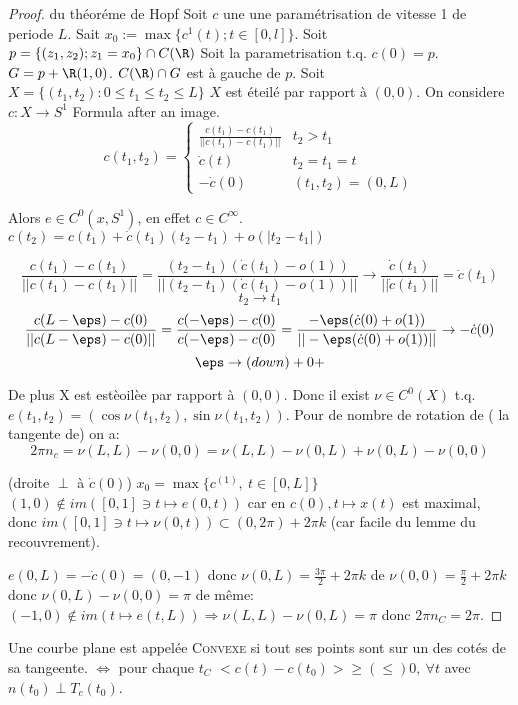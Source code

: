 \begin{proof}{du théoréme de Hopf}
	Soit $c$ une une paramétrisation de vitesse 1 de periode $L$. Sait $x_0:=\max\{c^1(t); t\in [0, l]\}$. Soit $p=\{(z_1, z_2); z_1=x_0\}\cap C(\R)$
	Soit la parametrisation t.q. $c(0)=p$. $G=p+\R(1,0)$. $C(\R)\cap G$ est à gauche de $p$.
	Soit $X=\{(t_1, t_2): 0\leq t_1\leq t_2 \leq L\}$ %
	$X$ est éteilé par rapport à $(0,0)$. On considere $c:X\rightarrow S^1$
	Formula after an image.
	$$c(t_1,t_2)=\left\{ \begin{array}{cr}\frac{c(t_1)-c(t_1)}{||c(t_1)-c(t_1)||} & t_2>t_1 \\ \dot c(t) & t_2=t_1=t \\ -\dot c(0) & (t_1, t_2)=(0,L)\end{array}\right.$$
	
	Alors $e\in C^0(x, S^1)$, en effet $c\in C^\infty.$ $c(t_2)=c(t_1)+\dot c(t_1)(t_2-t_1)+o(|t_2-t_1|)$
	
	$$\frac{c(t_1)-c(t_1)}{||c(t_1)-c(t_1)||}=\frac{(t_2-t_1)(\dot c(t_1)-o(1))}{||(t_2-t_1)(\dot c(t_1)-o(1))||}\to \frac{\dot c(t_1)}{||\dot c(t_1)||}=\dot c(t_1)$$
	$$t_2\to t_1$$
	$$\frac{c(L-\eps)-c(0)}{||c(L-\eps)-c(0)||}=\frac{c(-\eps)-c(0)}{c(-\eps)-c(0)}=\frac{-\eps(\dot c(0)+o(1))}{||-\eps(\dot c(0)+o(1))||}\to -\dot c(0)$$
	$$\eps\to(down) +0+$$
	
	De plus X est estèoilèe par rapport à $(0,0)$. Donc il exist $\nu\in C^0(X)$ t.q. $e(t_1, t_2)=(\cos \nu(t_1,t_2), \sin \nu(t_1,t_2))$. Pour de nombre de rotation de ( la tangente de) on a:
	$$2\pi n_c=\nu(L,L)-\nu(0,0)=\nu(L,L) - \nu(0,L)+\nu(0,L)-\nu(0,0)$$
	
	
	(droite $\perp$ à $\dot c(0)$) $x_0=\max \{ c^{(1)},\ t\in [0, L]\}$ $(1,0)\not\in im([0,1]\ni t\mapsto e(0,t))$ car en $c(0), t\mapsto x(t)$ est maximal, donc $im([0,1]\ni t\mapsto \nu(0,t))\subset (0,2\pi)+2\pi k$ (car facile du lemme du recouvrement).
	
	$e(0,L)=-\dot c(0)=(0,-1)$ donc $\nu (0,L)=\frac{3\pi}{2}+2\pi k$ de $\nu(0,0)=\frac{\pi}2+2\pi k $ donc $\nu(0,L)-\nu(0,0)=\pi$ de même: $(-1, 0)\not\in im(t\mapsto e(t, L))\Rightarrow \nu(L,L) - \nu(0, L)=\pi$ donc $2\pi n_C=2\pi$.
\end{proof}

\begin{definition}
	 Une courbe plane est appelée \textsc{Convexe} si tout ses points sont sur un des cotés de sa tangeente. $\Leftrightarrow$ pour chaque $t_C$ $<c(t)-c(t_0)>\geq(\leq) 0,\ \forall t$ avec $n(t_0)\perp T_c(t_0)$.
\end{definition}

